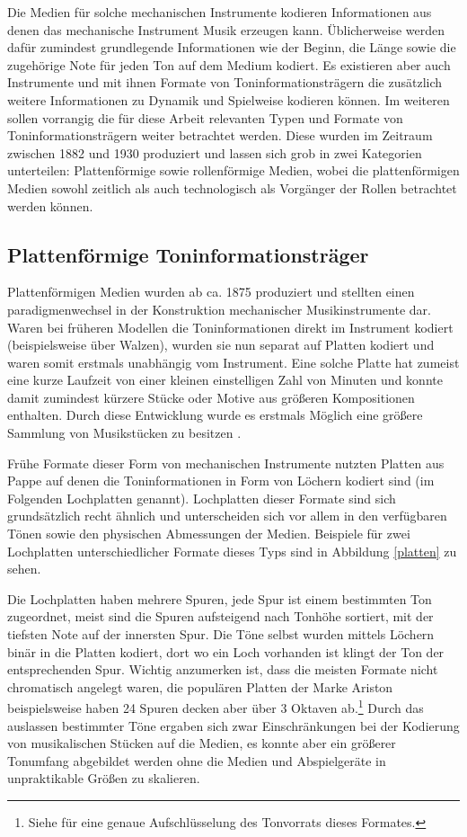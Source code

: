 Die Medien für solche mechanischen Instrumente kodieren Informationen aus denen das mechanische Instrument Musik erzeugen kann.
Üblicherweise werden dafür zumindest grundlegende Informationen wie der Beginn, die Länge sowie die zugehörige Note für jeden Ton auf dem Medium kodiert.
Es existieren aber auch Instrumente und mit ihnen Formate von Toninformationsträgern die zusätzlich weitere Informationen zu Dynamik und Spielweise kodieren können.
Im weiteren sollen vorrangig die für diese Arbeit relevanten Typen und Formate von Toninformationsträgern weiter betrachtet werden.
Diese wurden im Zeitraum zwischen 1882 und 1930 produziert und lassen sich grob in zwei Kategorien unterteilen: Plattenförmige sowie rollenförmige Medien, wobei die plattenförmigen Medien sowohl zeitlich als auch technologisch als Vorgänger der Rollen betrachtet werden können.

\subsection{Plattenförmige Toninformationsträger}

Plattenförmigen Medien wurden ab ca. 1875 produziert und stellten einen paradigmenwechsel in der Konstruktion mechanischer Musikinstrumente dar.
Waren bei früheren Modellen die Toninformationen direkt im Instrument kodiert (beispielsweise über Walzen), wurden sie nun separat auf Platten kodiert und waren somit erstmals unabhängig vom Instrument.
Eine solche Platte hat zumeist eine kurze Laufzeit von einer kleinen einstelligen Zahl von Minuten und konnte damit zumindest kürzere Stücke oder Motive aus größeren Kompositionen enthalten.
Durch diese Entwicklung wurde es erstmals Möglich eine größere Sammlung von Musikstücken zu besitzen \parencite[III.5.c. Plattenspieldosen und Drehinstrumente]{mgg_mechanische}.

Frühe Formate dieser Form von mechanischen Instrumente nutzten Platten aus Pappe auf denen die Toninformationen in Form von Löchern kodiert sind (im Folgenden Lochplatten genannt).
Lochplatten dieser Formate sind sich grundsätzlich recht ähnlich und unterscheiden sich vor allem in den verfügbaren Tönen sowie den physischen Abmessungen der Medien.
Beispiele für zwei Lochplatten unterschiedlicher Formate dieses Typs sind in Abbildung \ref{platten} zu sehen.

Die Lochplatten haben mehrere Spuren, jede Spur ist einem bestimmten Ton zugeordnet, meist sind die Spuren aufsteigend nach Tonhöhe sortiert, mit der tiefsten Note auf der innersten Spur.
Die Töne selbst wurden mittels Löchern binär in die Platten kodiert, dort wo ein Loch vorhanden ist klingt der Ton der entsprechenden Spur.
Wichtig anzumerken ist, dass die meisten Formate nicht chromatisch angelegt waren, die populären Platten der Marke Ariston beispielsweise haben 24 Spuren decken aber über 3 Oktaven ab.\footnote{Siehe \textcite[]{mxp_2003520} für eine genaue Aufschlüsselung des Tonvorrats dieses Formates.}
Durch das auslassen bestimmter Töne ergaben sich zwar Einschränkungen bei der Kodierung von musikalischen Stücken auf die Medien, es konnte aber ein größerer Tonumfang abgebildet werden ohne die Medien und Abspielgeräte in unpraktikable Größen zu skalieren.

